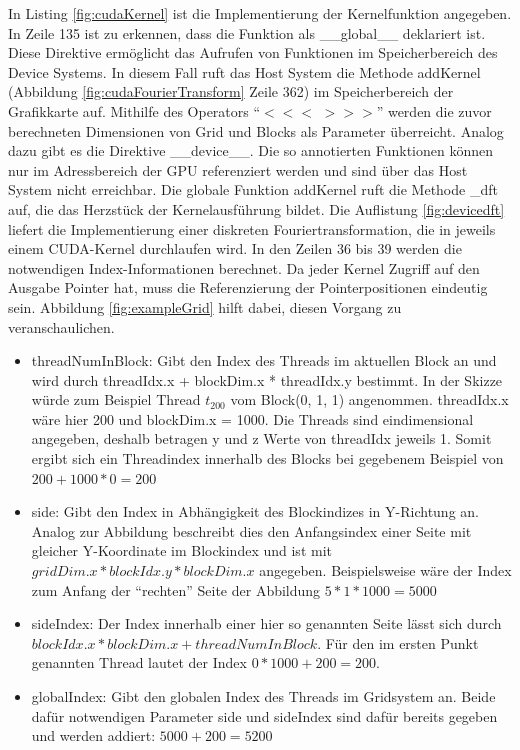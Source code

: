 In Listing \ref{fig:cudaKernel} ist die Implementierung der Kernelfunktion angegeben. In Zeile 135 ist zu erkennen, dass die Funktion als \_\_global\_\_ deklariert ist. Diese Direktive ermöglicht das Aufrufen von Funktionen im Speicherbereich des Device Systems. In diesem Fall ruft das Host System die Methode addKernel (Abbildung \ref{fig:cudaFourierTransform} Zeile 362) im Speicherbereich der Grafikkarte auf. Mithilfe des Operators \enquote{$<<<$ $>>>$} werden die zuvor berechneten Dimensionen von Grid und Blocks als Parameter überreicht. Analog dazu gibt es die Direktive \_\_device\_\_. Die so annotierten Funktionen können nur im Adressbereich der GPU referenziert werden und sind über das Host System nicht erreichbar. Die globale Funktion addKernel ruft die Methode \_dft auf, die das Herzstück der Kernelausführung bildet. Die Auflistung \ref{fig:devicedft} liefert die Implementierung einer diskreten Fouriertransformation, die in jeweils einem CUDA-Kernel durchlaufen wird. In den Zeilen 36 bis 39 werden die notwendigen Index-Informationen berechnet. Da jeder Kernel Zugriff auf den Ausgabe Pointer hat, muss die Referenzierung der Pointerpositionen eindeutig sein. Abbildung \ref{fig:exampleGrid} hilft dabei, diesen Vorgang zu veranschaulichen.
\begin{itemize}
	\item threadNumInBlock: Gibt den Index des Threads im aktuellen Block an und wird durch threadIdx.x + blockDim.x * threadIdx.y bestimmt. In der Skizze würde zum Beispiel Thread $t_{200}$ vom Block(0, 1, 1) angenommen. threadIdx.x wäre hier 200 und blockDim.x = 1000. Die Threads sind eindimensional angegeben, deshalb betragen y und z Werte von threadIdx jeweils 1.
	Somit ergibt sich ein Threadindex innerhalb des Blocks bei gegebenem Beispiel von $200 + 1000 * 0 = 200$
	\item side: Gibt den Index in Abhängigkeit des Blockindizes in Y-Richtung an. Analog zur Abbildung beschreibt dies den Anfangsindex einer Seite mit gleicher Y-Koordinate im Blockindex und ist mit $gridDim.x * blockIdx.y * blockDim.x$ angegeben. Beispielsweise wäre der Index zum Anfang der \enquote{rechten} Seite der Abbildung $5 * 1 * 1000 = 5000$
	\item sideIndex: Der Index innerhalb einer hier so genannten Seite lässt sich durch $blockIdx.x * blockDim.x + threadNumInBlock$. Für den im ersten Punkt genannten Thread lautet der Index $0 * 1000 + 200 = 200$.
	\item globalIndex: Gibt den globalen Index des Threads im Gridsystem an. Beide dafür notwendigen Parameter side und sideIndex sind dafür bereits gegeben und werden addiert:
	$5000 + 200 = 5200$
\end{itemize}

